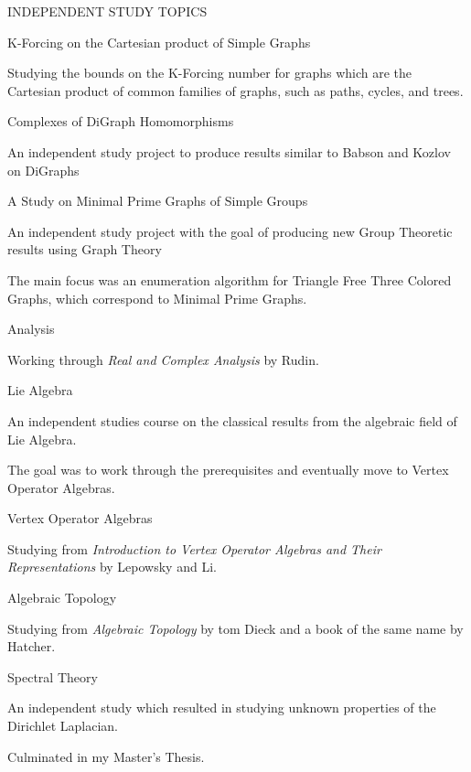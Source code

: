 \documentclass{resume} %
\begin{document}
\begin{rSection}{INDEPENDENT STUDY TOPICS}{}{} {}
 \begin{rSubsection}{K-Forcing on the Cartesian product of Simple Graphs}{}{}{}
 \item Studying the bounds on the K-Forcing number for graphs which are the Cartesian product of common families of graphs, such as paths, cycles, and trees.
 \end{rSubsection}
 
 \begin{rSubsection}{Complexes of DiGraph Homomorphisms}{}{}{}
 \item An independent study project to produce results similar to Babson and Kozlov on DiGraphs
 \end{rSubsection}
 
  \begin{rSubsection}{A Study on Minimal Prime Graphs of Simple Groups}{}{}{}
  \item An independent study project with the goal of producing new Group Theoretic results using Graph Theory
  \item The main focus was an enumeration algorithm for Triangle Free Three Colored Graphs, which correspond to Minimal Prime Graphs.
 \end{rSubsection}

 \begin{rSubsection}{Analysis}{}{}{}
 \item Working through \textit{Real and Complex Analysis} by Rudin.
 \end{rSubsection}
 
 \begin{rSubsection}{Lie Algebra}{}{}{}
  \item An independent studies course on the classical results from the algebraic field of Lie Algebra.
  \item The goal was to work through the prerequisites and eventually move to Vertex Operator Algebras.
 \end{rSubsection}
 
  \begin{rSubsection}{Vertex Operator Algebras}{}{}{}
  \item Studying from \textit{Introduction to Vertex Operator Algebras and Their Representations} by Lepowsky and Li.
 \end{rSubsection}

 \begin{rSubsection}{Algebraic Topology}{}{}{}
 \item Studying from \textit{Algebraic Topology} by tom Dieck and a book of the same name by Hatcher. 
 \end{rSubsection}

 \begin{rSubsection}{Spectral Theory}{}{}{}
 \item An independent study which resulted in studying unknown properties of the Dirichlet Laplacian.
 \item Culminated in my Master's Thesis.
 \end{rSubsection}
\end{rSection}
\end{document}
